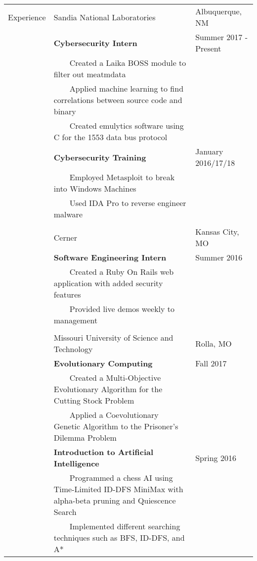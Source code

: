 \documentclass[10.5pt, arial]{article}
\newcommand{\tabitem}{~~\llap{\textbullet}~~}
\begin{document}
\begin{tabular}{p{1.5cm} p{13.2cm} l}
Experience  & Sandia National Laboratories	& Albuquerque, NM 		\\
			& \textbf{Cybersecurity Intern}										& Summer 2017 - Present 		\\
			& \tabitem Created a Laika BOSS module to filter out meatmdata		&						\\
			& \tabitem Applied machine learning to find correlations between source code and binary & 	\\
			& \tabitem Created emulytics software using C for the 1553 data bus protocol 	&			\\
			& \textbf{Cybersecurity Training} 									& January 2016/17/18 			\\
			& \tabitem Employed Metasploit to break into Windows Machines			& 						\\
			& \tabitem Used IDA Pro to reverse engineer malware 				& 						\\ \\

			& Cerner 															& Kansas City, MO 		\\
			& \textbf{Software Engineering Intern} 								& Summer 2016			\\
			& \tabitem Created a Ruby On Rails web application with added security features					& 						\\
			& \tabitem Provided live demos weekly to management 				& 						\\ \\

			& Missouri University of Science and Technology						& Rolla, MO 			\\
			& \textbf{Evolutionary Computing} 									& Fall 2017 			\\
			& \tabitem Created a Multi-Objective Evolutionary Algorithm for the Cutting Stock Problem	& \\
			& \tabitem Applied a Coevolutionary Genetic Algorithm to the Prisoner's Dilemma Problem 	& 		\\

			& \textbf{Introduction to Artificial Intelligence} 					& Spring 2016 			\\
			& \tabitem Programmed a chess AI using Time-Limited ID-DFS MiniMax with alpha-beta pruning and Quiescence Search	& \\
			& \tabitem Implemented different searching techniques such as BFS, ID-DFS, and A* 	& 		\\


\end{tabular}
\end{document}
